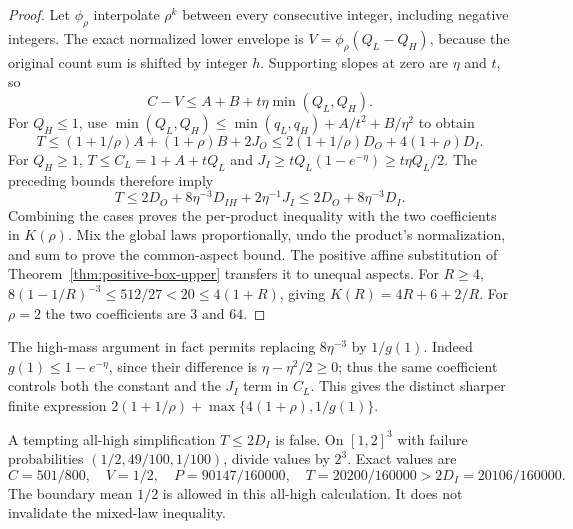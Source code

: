 \begin{proof}
Let $\phi_\rho$ interpolate $\rho^k$ between every consecutive integer,
including negative integers. The exact normalized lower envelope is
$V=\phi_\rho(Q_L-Q_H)$, because the original count sum is shifted by
integer $h$. Supporting slopes at zero are $\eta$ and $t$, so
\begin{equation}\label{eq:coarse-target}
 C-V\le A+B+t\eta\min(Q_L,Q_H).
\end{equation}
For $Q_H\le1$, use
$\min(Q_L,Q_H)\le\min(q_L,q_H)+A/t^2+B/\eta^2$ to obtain
\[
 T\le(1+1/\rho)A+(1+\rho)B+2J_O
 \le2(1+1/\rho)D_O+4(1+\rho)D_I.
\]
For $Q_H\ge1$, $T\le C_L=1+A+tQ_L$ and
$J_I\ge tQ_L(1-e^{-\eta})\ge t\eta Q_L/2$.
The preceding bounds therefore imply
\[
 T\le2D_O+8\eta^{-3}D_{IH}+2\eta^{-1}J_I
      \le2D_O+8\eta^{-3}D_I.
\]
Combining the cases proves the per-product inequality with the two
coefficients in $K(\rho)$. Mix the global laws proportionally, undo
the product's normalization, and sum to prove the common-aspect bound.
The positive affine substitution of
Theorem~\ref{thm:positive-box-upper} transfers it to unequal aspects.
For $R\ge4$, $8(1-1/R)^{-3}\le512/27<20\le4(1+R)$, giving
$K(R)=4R+6+2/R$. For $\rho=2$ the two coefficients are $3$ and $64$.
\end{proof}
The high-mass argument in fact permits replacing $8\eta^{-3}$ by
$1/g(1)$. Indeed $g(1)\le1-e^{-\eta}$, since their difference is
$\eta-\eta^2/2\ge0$; thus the same coefficient controls both the
constant and the $J_I$ term in $C_L$. This gives the distinct sharper
finite expression
$2(1+1/\rho)+\max\{4(1+\rho),1/g(1)\}$.

A tempting all-high simplification $T\le2D_I$ is false. On $[1,2]^3$
with failure probabilities $(1/2,49/100,1/100)$, divide values by
$2^3$. Exact values are
\[
 C=501/800,\quad V=1/2,\quad P=90147/160000,
 \quad T=20200/160000>2D_I=20106/160000.
\]
The boundary mean $1/2$ is allowed in this all-high calculation.
It does not invalidate the mixed-law inequality.

